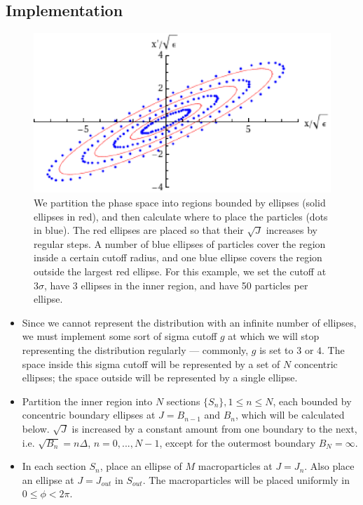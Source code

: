 \subsection{Implementation}
\begin{figure}[htp]
	\centering \includegraphics[scale=0.75]{filledellipse.eps}
	\caption{We partition the phase space into regions bounded by ellipses (solid ellipses in red), and then calculate where to place the particles (dots in blue).  The red ellipses are placed so that their $\sqrt{J}$ increases by regular steps.  A number of blue ellipses of particles cover the region inside a certain cutoff radius, and one blue ellipse covers the region outside the largest red ellipse.  For this example, we set the cutoff at 3$\sigma$, have 3 ellipses in the inner region, and have 50 particles per ellipse.}
	\label{fig:finishedellipse}
\end{figure}

\begin{itemize}
\item Since we cannot represent the distribution with an infinite number of ellipses, we must implement some sort of sigma cutoff $g$ at which we will stop representing the distribution regularly --- commonly, $g$ is set to $3$ or $4$.  The space inside this sigma cutoff will be represented by a set of $N$ concentric ellipses; the space outside will be represented by a single ellipse.
\item Partition the inner region into $N$ sections $\lbrace S_{n} \rbrace, 1 \leq n \leq N$, each bounded by concentric boundary ellipses at $J = B_{n-1}$ and $B_{n}$, which will be calculated below.  $\sqrt{J}$ is increased by a constant amount from one boundary to the next, i.e. $\sqrt{B_{n}} = n\Delta$, $n = 0,...,N-1$, except for the outermost boundary $B_{N} = \infty$.
\item In each section $S_{n}$, place an ellipse of $M$ macroparticles at $J = J_{n}$.  Also place an ellipse at $J = J_{out}$ in $S_{out}$.  The macroparticles will be placed uniformly in $0 \leq \phi < 2\pi$.
\end{itemize}

